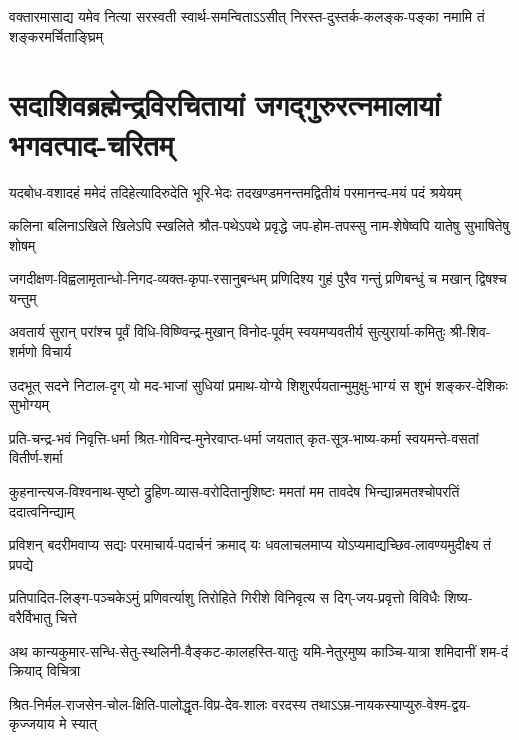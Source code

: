 
\twolineshloka
{वक्तारमासाद्य यमेव नित्या सरस्वती स्वार्थ-समन्विताऽऽसीत्}
{निरस्त-दुस्तर्क-कलङ्क-पङ्का नमामि तं शङ्करमर्चिताङ्घ्रिम्}



\section{सदाशिवब्रह्मेन्द्रविरचितायां जगद्गुरुरत्नमालायां भगवत्पाद-चरितम्}

\twolineshloka
{यदबोध-वशादहं ममेदं तदिहेत्यादिरुदेति भूरि-भेदः}
{तदखण्डमनन्तमद्वितीयं परमानन्द-मयं पदं श्रयेयम्}

\twolineshloka
{कलिना बलिनाऽखिले खिलेऽपि स्खलिते श्रौत-पथेऽपथे प्रवृद्धे}
{जप-होम-तपस्सु नाम-शेषेष्वपि यातेषु सुभाषितेषु शोषम्}

\twolineshloka
{जगदीक्षण-विह्वलामृतान्धो-निगद-व्यक्त-कृपा-रसानुबन्धम्}
{प्रणिदिश्य गुहं पुरैव गन्तुं प्रणिबन्धुं च मखान् द्विषश्च यन्तुम्}

\twolineshloka
{अवतार्य सुरान् परांश्च पूर्वं विधि-विष्ण्विन्द्र-मुखान् विनोद-पूर्वम्}
{स्वयमप्यवतीर्य सुत्युरार्या-कमितुः श्री-शिव-शर्मणो विचार्य}

\twolineshloka
{उदभूत् सदने निटाल-दृग् यो मद-भाजां सुधियां प्रमाथ-योग्ये}
{शिशुरर्पयतान्मुमुक्षु-भाग्यं स शुभं शङ्कर-देशिकः सुभोग्यम्}

\twolineshloka
{प्रति-चन्द्र-भवं निवृत्ति-धर्मा श्रित-गोविन्द-मुनेरवाप्त-धर्मा}
{जयतात् कृत-सूत्र-भाष्य-कर्मा स्वयमन्ते-वसतां वितीर्ण-शर्मा}

\twolineshloka
{कुहनान्त्यज-विश्वनाथ-सृष्टो द्रुहिण-व्यास-वरोदितानुशिष्टः}
{ममतां मम तावदेष भिन्द्यान्नमतश्चोपरतिं ददात्वनिन्द्याम्}

\twolineshloka
{प्रविशन् बदरीमवाप्य सद्यः परमाचार्य-पदार्चनं क्रमाद् यः}
{धवलाचलमाप्य योऽप्यमाद्यच्छिव-लावण्यमुदीक्ष्य तं प्रपद्ये}

\twolineshloka
{प्रतिपादित-लिङ्ग-पञ्चकेऽमुं प्रणिवर्त्याशु तिरोहिते गिरीशे}
{विनिवृत्य स दिग्-जय-प्रवृत्तो विविधैः शिष्य-वरैर्विभातु चित्ते}

\twolineshloka
{अथ कान्यकुमार-सन्धि-सेतु-स्थलिनी-वैङ्कट-कालहस्ति-यातुः}
{यमि-नेतुरमुष्य काञ्चि-यात्रा शमिदानीं शम-दं क्रियाद् विचित्रा}

\twolineshloka
{श्रित-निर्मल-राजसेन-चोल-क्षिति-पालोद्धृत-विप्र-देव-शालः}
{वरदस्य तथाऽऽम्र-नायकस्याप्युरु-वेश्म-द्वय-कृज्जयाय मे स्यात्}

